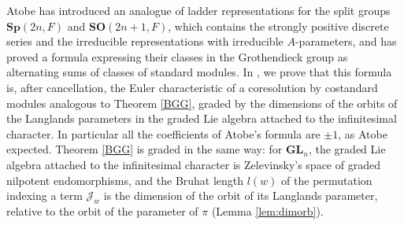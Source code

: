 \documentclass[a4paper,12pt,leqno]{amsart}
\newcommand{\caJ}{\mathcal{J}}
\theoremstyle{plain}
\theoremstyle{definition}
\theoremstyle{definition}
\newcommand{\GL}{\mathbf{GL}}
\begin{document}
Atobe \cite{Ato24} has introduced an analogue of ladder representations for the split groups
$\mathbf{Sp}(2n,F)$ and $\mathbf{SO}(2n+1,F)$, which contains the strongly positive discrete series and
the irreducible representations with irreducible $A$-parameters, and has proved a formula expressing
their classes in the Grothendieck group as alternating sums of classes of standard modules.
 In \cite{Ren26b}, we prove that this formula is, after cancellation, the Euler characteristic of a coresolution
by costandard modules analogous to Theorem \ref{BGG}, graded by the dimensions of the orbits of the
Langlands parameters in the graded Lie algebra attached to the infinitesimal character. In particular all the coefficients
of Atobe's formula are $\pm1$, as Atobe expected. Theorem \ref{BGG} is graded in the same way: for
$\GL_n$, the graded Lie algebra attached to the infinitesimal character is Zelevinsky's space of graded
nilpotent endomorphisms, and the Bruhat length $l(w)$ of the permutation indexing a term $\caJ_w$ is the
dimension of the orbit of its Langlands parameter, relative to the orbit of the parameter of $\pi$
(Lemma \ref{lem:dimorb}).
\end{document}
